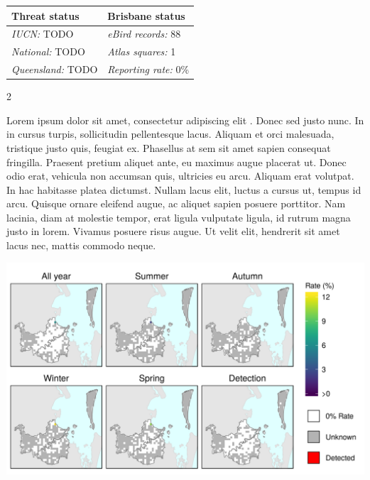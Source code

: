 \documentclass[12pt,openany,oneside]{book}
\let\origfigure\figure
\let\endorigfigure\endfigure
\renewenvironment{figure}[1][2] {
  \expandafter\origfigure\expandafter[H]
} {
  \endorigfigure
}
\let\Begin\begin
\let\End\end
\theoremstyle{definition}
\theoremstyle{definition}
\theoremstyle{definition}
\theoremstyle{remark}
\begin{document}
\begin{tabu} to 
\toprule
Threat status & Brisbane status\\
\midrule
\textit{IUCN:} TODO & \textit{eBird records:} 88\\
\textit{National:} TODO & \textit{Atlas squares:} 1\\
\textit{Queensland:} TODO & \textit{Reporting rate:} 0\%\\
\bottomrule
\end{tabu} 
\vspace{0.15cm}

\Begin{multicols}{2}

Lorem ipsum dolor sit amet, consectetur adipiscing elit
\citep{rexample1, rexample2, rexample3}. Donec sed justo nunc. In in
cursus turpis, sollicitudin pellentesque lacus. Aliquam et orci
malesuada, tristique justo quis, feugiat ex. Phasellus at sem sit amet
sapien consequat fringilla. Praesent pretium aliquet ante, eu maximus
augue placerat ut. Donec odio erat, vehicula non accumsan quis,
ultricies eu arcu. Aliquam erat volutpat. In hac habitasse platea
dictumst. Nullam lacus elit, luctus a cursus ut, tempus id arcu. Quisque
ornare eleifend augue, ac aliquet sapien posuere porttitor. Nam lacinia,
diam at molestie tempor, erat ligula vulputate ligula, id rutrum magna
justo in lorem. Vivamus posuere risus augue. Ut velit elit, hendrerit
sit amet lacus nec, mattis commodo neque.

\End{multicols}

\clearpage

\begin{figure}
\centering
\includegraphics[height=0.47\textheight,width=\textwidth,keepaspectratio=true]{assets/maps/Biziura-lobata.png}
\end{figure}
\end{document}
